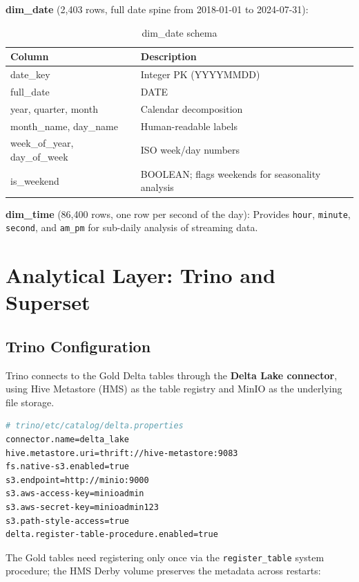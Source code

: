 \documentclass[a4paper]{article}
\begin{document}
\textbf{dim\_date} (2,403 rows, full date spine from 2018-01-01 to 2024-07-31):
\begin{table}[H]
\centering
\begin{tabular}{|l|l|}
\hline
\textbf{Column} & \textbf{Description} \\
\hline
date\_key & Integer PK (YYYYMMDD) \\
\hline
full\_date & DATE \\
\hline
year, quarter, month & Calendar decomposition \\
\hline
month\_name, day\_name & Human-readable labels \\
\hline
week\_of\_year, day\_of\_week & ISO week/day numbers \\
\hline
is\_weekend & BOOLEAN; flags weekends for seasonality analysis \\
\hline
\end{tabular}
\caption{dim\_date schema}
\end{table}

\textbf{dim\_time} (86,400 rows, one row per second of the day):
Provides \texttt{hour}, \texttt{minute}, \texttt{second}, and \texttt{am\_pm}
for sub-daily analysis of streaming data.

\section{Analytical Layer: Trino and Superset}

\subsection{Trino Configuration}

Trino connects to the Gold Delta tables through the \textbf{Delta Lake
connector}, using Hive Metastore (HMS) as the table registry and MinIO as the
underlying file storage.

\begin{lstlisting}[language=bash]
# trino/etc/catalog/delta.properties
connector.name=delta_lake
hive.metastore.uri=thrift://hive-metastore:9083
fs.native-s3.enabled=true
s3.endpoint=http://minio:9000
s3.aws-access-key=minioadmin
s3.aws-secret-key=minioadmin123
s3.path-style-access=true
delta.register-table-procedure.enabled=true
\end{lstlisting}

The Gold tables need registering only once via the \texttt{register\_table}
system procedure; the HMS Derby volume preserves the metadata across restarts:
\end{document}
